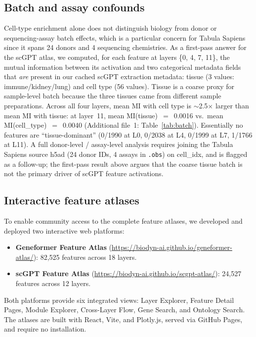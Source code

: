 \documentclass[onecolumn]{article}
\begin{document}
\subsection{Batch and assay confounds}
\label{sec:batch}

Cell-type enrichment alone does not distinguish biology from donor or sequencing-assay batch effects, which is a particular concern for Tabula Sapiens since it spans 24 donors and 4 sequencing chemistries. As a first-pass answer for the scGPT atlas, we computed, for each feature at layers \{0, 4, 7, 11\}, the mutual information between its activation and two categorical metadata fields that \emph{are} present in our cached scGPT extraction metadata: tissue (3 values: immune/kidney/lung) and cell type (56 values). Tissue is a coarse proxy for sample-level batch because the three tissues came from different sample preparations. Across all four layers, mean MI with cell type is $\sim$2.5$\times$ larger than mean MI with tissue: at layer~11, mean MI(tissue)~$=$~0.0016 vs.\ mean MI(cell\_type)~$=$~0.0040 (Additional file~1: Table~\ref{tab:batch}). Essentially no features are ``tissue-dominant'' (0/1990 at L0, 0/2038 at L4, 0/1999 at L7, 1/1766 at L11). A full donor-level / assay-level analysis requires joining the Tabula Sapiens source h5ad (24 donor IDs, 4 assays in \texttt{.obs}) on cell\_idx, and is flagged as a follow-up; the first-pass result above argues that the coarse tissue batch is not the primary driver of scGPT feature activations.


\subsection{Interactive feature atlases}
\label{sec:atlases}

To enable community access to the complete feature atlases, we developed and deployed two interactive web platforms:

\begin{itemize}
\item \textbf{Geneformer Feature Atlas} (\url{https://biodyn-ai.github.io/geneformer-atlas/}): 82,525 features across 18 layers.
\item \textbf{scGPT Feature Atlas} (\url{https://biodyn-ai.github.io/scgpt-atlas/}): 24,527 features across 12 layers.
\end{itemize}

Both platforms provide six integrated views: Layer Explorer, Feature Detail Pages, Module Explorer, Cross-Layer Flow, Gene Search, and Ontology Search. The atlases are built with React, Vite, and Plotly.js, served via GitHub Pages, and require no installation.
\end{document}
